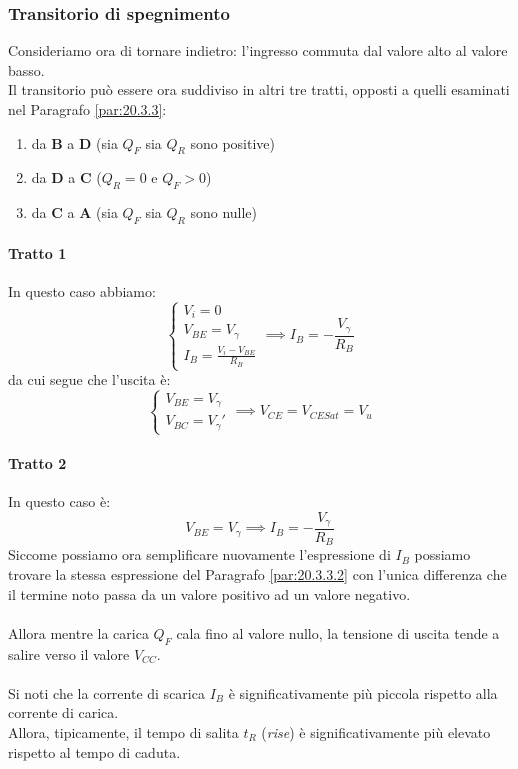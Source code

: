 \documentclass[../main.tex]{subfiles}
\begin{document}
	\subsubsection{Transitorio di spegnimento}
	Consideriamo ora di tornare indietro: l'ingresso commuta dal valore alto al valore basso.\\
	Il transitorio può essere ora suddiviso in altri tre tratti, opposti a quelli esaminati nel Paragrafo \ref{par:20.3.3}:
	\begin{enumerate}
		\item da \textbf{B} a \textbf{D} (sia $Q_F$ sia $Q_R$ sono positive)
		\item da \textbf{D} a \textbf{C} ($Q_R = 0$ e $Q_F > 0$)
		\item da \textbf{C} a \textbf{A} (sia $Q_F$ sia $Q_R$ sono nulle)
	\end{enumerate}
	\paragraph{Tratto 1}
	In questo caso abbiamo:
	\[ \begin{cases} V_i = 0 \\ V_{BE} = V_\gamma \\ I_B = \frac{V_i - V_{BE}}{R_B} \end{cases} \implies I_B = -\frac{V_\gamma}{R_B} \]
	da cui segue che l'uscita è:
	\[ \begin{cases} V_{BE} = V_\gamma \\ V_{BC} = V_\gamma' \end{cases} \implies V_{CE} = V_{CESat} = V_u \]
	\paragraph{Tratto 2}
	In questo caso è:
	\[ V_{BE} = V_\gamma \implies I_B = -\frac{V_\gamma}{R_B} \]
	Siccome possiamo ora semplificare nuovamente l'espressione di $I_B$ possiamo trovare la stessa espressione del Paragrafo \ref{par:20.3.3.2} con l'unica differenza che il termine noto passa da un valore positivo ad un valore negativo.\\\\
	Allora mentre la carica $Q_F$ cala fino al valore nullo, la tensione di uscita tende a salire verso il valore $V_{CC}$.\\\\
	Si noti che la corrente di scarica $I_B$ è significativamente più piccola rispetto alla corrente di carica.\\
	Allora, tipicamente, il tempo di salita $t_R$ (\textit{rise}) è significativamente più elevato rispetto al tempo di caduta.
\end{document}
